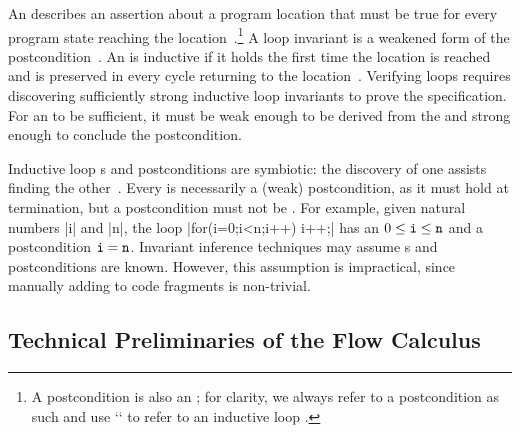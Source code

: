 An \emph{} describes an assertion about a program location that must be true for every program state reaching the location~\cite{furia2010,nguyen2022}.\footnote{A postcondition is also an ; for clarity, we always refer to a postcondition as such and use `` to refer to an inductive loop .}
A {loop invariant} is a weakened form of the postcondition~\cite{furia2010}.
An  is {inductive} if it holds the first time the location is reached and is preserved in every cycle returning to the location~\cite{sankaranarayanan2004}.
Verifying loops requires discovering {sufficiently strong} inductive loop invariants to prove the specification.
For an  to be sufficient, it must be weak enough to be derived from the  and strong enough to conclude the postcondition.

Inductive loop s and postconditions are symbiotic: the discovery of one assists finding the other~\cite{furia2010}.
Every  is necessarily a (weak) postcondition, as it must hold at termination, but a postcondition must not be .
For example, given natural numbers \pr|i| and \pr|n|, the loop \prc|for(i=0;i<n;i++) i++;| has an  \(0 \leq \prm{i} \leq \prm{n}\) and a postcondition \(\prm{i}=\prm{n}\).
Invariant inference techniques may assume s and postconditions are known.
However, this assumption is impractical, since manually adding  to code fragments is non-trivial.

\subsection{Technical Preliminaries of the Flow Calculus}
\label{sec:calc}

